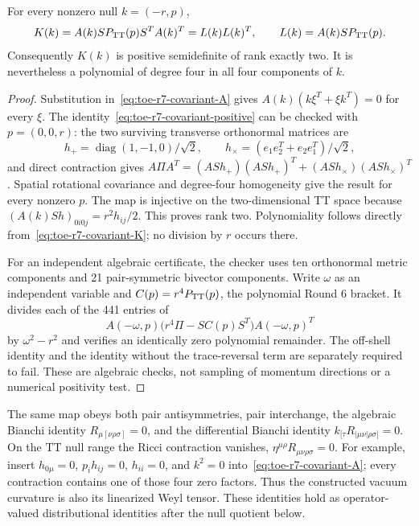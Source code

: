 \begin{lemma}
For every nonzero null $k=(-r,p)$,
\begin{equation}
 K(k)=A(k)S P_{\mathrm{TT}}(p)S^TA(k)^T
       =L(k)L(k)^T,\qquad L(k)=A(k)S P_{\mathrm{TT}}(p).
 \label{eq:toe-r7-covariant-positive}
\end{equation}
Consequently $K(k)$ is positive semidefinite of rank exactly two.
It is nevertheless a polynomial of degree four in all four components of $k$.
\end{lemma}
\begin{proof}
Substitution in~\eqref{eq:toe-r7-covariant-A} gives $A(k)(k\xi^T+\xi k^T)=0$ for every
$\xi$. The identity~\eqref{eq:toe-r7-covariant-positive} can be checked with $p=(0,0,r)$:
the two surviving transverse orthonormal matrices are
\[
 h_+=\operatorname{diag}(1,-1,0)/\sqrt2,\qquad
 h_\times=(e_1e_2^T+e_2e_1^T)/\sqrt2,
\]
and direct contraction gives
$A\Pi A^T=(ASh_+)(ASh_+)^T+(ASh_\times)(ASh_\times)^T$.
Spatial rotational covariance and degree-four homogeneity give the result
for every nonzero $p$. The map is injective on the two-dimensional TT
space because $(A(k)Sh)_{0i0j}=r^2h_{ij}/2$. This proves rank two.
Polynomiality follows directly from~\eqref{eq:toe-r7-covariant-K}; no division by $r$
occurs there.

For an independent algebraic certificate, the checker uses ten orthonormal
metric components and 21 pair-symmetric bivector components. Write
$\omega$ as an independent variable and $C(p)=r^4P_{\mathrm{TT}}(p)$, the polynomial
Round 6 bracket. It divides each of the 441 entries of
\[
 A(-\omega,p)\bigl(r^4\Pi-SC(p)S^T\bigr)A(-\omega,p)^T
\]
by $\omega^2-r^2$ and verifies an identically zero polynomial remainder.
The off-shell identity and the identity without the trace-reversal term
are separately required to fail. These are algebraic checks, not sampling
of momentum directions or a numerical positivity test.
\end{proof}

The same map obeys both pair antisymmetries, pair interchange, the algebraic
Bianchi identity $R_{\mu[\nu\rho\sigma]}=0$, and the differential Bianchi
identity $k_{[\tau}R_{|\mu\nu|\rho\sigma]}=0$.
On the TT null range the Ricci contraction vanishes,
$\eta^{\mu\rho}R_{\mu\nu\rho\sigma}=0$. For example, insert $h_{0\mu}=0$,
$p_ih_{ij}=0$, $h_{ii}=0$, and $k^2=0$ into~\eqref{eq:toe-r7-covariant-A}; every contraction
contains one of those four zero factors. Thus the constructed vacuum
curvature is also its linearized Weyl tensor. These identities hold as
operator-valued distributional identities after the null quotient below.

